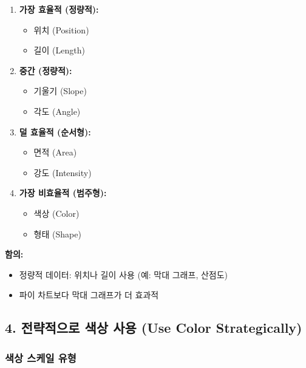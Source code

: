 \documentclass[12pt,a4paper]{article}
\begin{document}
\begin{enumerate}
    \item \textbf{가장 효율적 (정량적):}
    \begin{itemize}
        \item 위치 (Position)
        \item 길이 (Length)
    \end{itemize}
    \item \textbf{중간 (정량적):}
    \begin{itemize}
        \item 기울기 (Slope)
        \item 각도 (Angle)
    \end{itemize}
    \item \textbf{덜 효율적 (순서형):}
    \begin{itemize}
        \item 면적 (Area)
        \item 강도 (Intensity)
    \end{itemize}
    \item \textbf{가장 비효율적 (범주형):}
    \begin{itemize}
        \item 색상 (Color)
        \item 형태 (Shape)
    \end{itemize}
\end{enumerate}

\textbf{함의:}
\begin{itemize}
    \item 정량적 데이터: 위치나 길이 사용 (예: 막대 그래프, 산점도)
    \item 파이 차트보다 막대 그래프가 더 효과적
\end{itemize}

\subsection{4. 전략적으로 색상 사용 (Use Color Strategically)}

\subsubsection{색상 스케일 유형}
\end{document}
